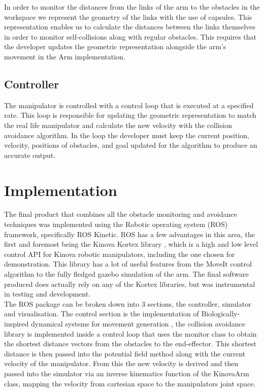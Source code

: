 \documentclass[a4paper, 10pt, conference]{ieeeconf}      %
\begin{document}
In order to monitor the distances from the links of the arm to the obstacles in the workspace we represent the geometry of the links with the use of capsules. This representation enables us to calculate the distances between the links themselves in order to monitor self-collisions along with regular obstacles. This requires that the developer updates the geometric representation alongside the arm’s movement in the Arm implementation. 

\subsection{Controller} %

The manipulator is controlled with a control loop that is executed at a specified rate. This loop is responsible for updating the geometric representation to match the real life manipulator and calculate the new velocity with the collision avoidance algorithm. In the loop the developer must keep the current position, velocity, positions of obstacles, and goal updated for the algorithm to produce an accurate output. 
 
 
\section{Implementation} %
The final product that combines all the obstacle monitoring and avoidance techniques was implemented using the Robotic operating system (ROS) framework, specifically ROS Kinetic. ROS has a few advantages in this area, the first and foremost being the Kinova Kortex library \cite{kortex}, which is a high and low level control API for Kinova robotic manipulators, including the one chosen for demonstration. This library has a lot of useful features from the MoveIt control algorithm to the fully fledged gazebo simulation of the arm. The final software produced does actually rely on any of the Kortex libraries, but was instrumental in testing and development. \\

The ROS package can be broken down into 3 sections, the controller, simulator and visualisation. The control section is the implementation of Biologically-inspired dynamical systems for movement generation \cite{Hoffmann}, the collision avoidance library is implemented inside a control loop that uses the monitor class to obtain the shortest distance vectors from the obstacles to the end-effector. This shortest distance is then passed into the potential field method along with the current velocity of the manipulator. From this the new velocity is derived and then passed into the simulator via an inverse kinematics function of the KinovaArm class, mapping the velocity from cartesian space to the manipulators joint space. \\
\end{document}
